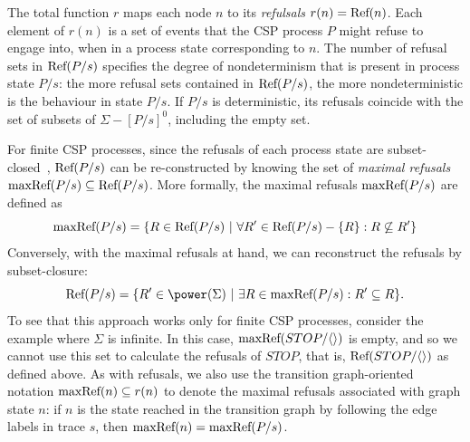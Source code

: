 The total function $r$ maps each node $n$ to its \emph{refulsals} $r(n) =
\text{Ref}(n)$. Each element of $r(n)$ is a set of events that the CSP process $P$
might refuse to engage into, when in a process state corresponding to $n$.
The number of refusal sets in $\text{Ref}(P/s)$ specifies the degree of
nondeterminism that is present in process state $P/s$: the more refusal sets
contained in  $\text{Ref}(P/s)$, the more nondeterministic is the behaviour in
state $P/s$. If $P/s$ is deterministic, its refusals coincide with the set of
subsets of $\Sigma - [P/s]^0$, including the empty set.

For finite CSP processes, since the refusals of each process state are
subset-closed~\cite{Hoare:1985:CSP:3921,Roscoe2010}, $\text{Ref}(P/s)$ can be
re-constructed by knowing the set of \emph{maximal refusals}
$\text{maxRef}(P/s)\subseteq\text{Ref}(P/s)$. More formally, the maximal refusals
$\text{maxRef}(P/s)$ are defined as
$$
\text{maxRef}(P/s) = \{ R \in\text{Ref}(P/s)~|~\forall R'\in \text{Ref}(P/s) - \{ R\}: R \not\subseteq R'\}
$$
Conversely, with the maximal refusals at hand, we can reconstruct the refusals by subset-closure:
$$
\refs(P/s) = \{ R'\in\power(\Sigma)~|~\exists R\in \maxrefs(P/s): R'\subseteq R \}.
$$
To see that this approach works only for finite CSP processes, consider the
example where $\Sigma$ is infinite. In this case,
$\text{maxRef}(STOP/\langle\rangle)$ is empty, and so we cannot use this set to
calculate the refusals of $STOP$, that is, $\text{Ref}(STOP/\langle\rangle)$ as
defined above. As with refusals, we also use the transition graph-oriented
notation $\text{maxRef}(n) \subseteq r(n)$ to denote the maximal refusals
associated with graph state $n$: if $n$ is the state reached in the
transition graph by following the edge labels in trace $s$, then $\text{maxRef}(n)
= \text{maxRef}(P/s)$.

